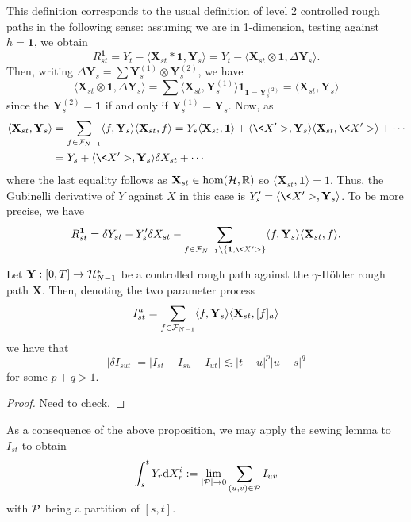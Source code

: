 \documentclass[11pt]{style/preprint}
\begin{document}
This definition corresponds to the usual definition of level 2 controlled rough paths in the following sense: 
assuming we are in 1-dimension, testing against \(h = \mathbf{1}\), we obtain
\[R^{\mathbf{1}}_{st} = Y_t - \langle \mathbf{X}_{st} * \mathbf{1}, \mathbf{Y}_s\rangle
  = Y_t - \langle \mathbf{X}_{st} \otimes \mathbf{1}, \Delta \mathbf{Y}_s\rangle.\]
Then, writing \(\Delta \mathbf{Y}_s = \sum \mathbf{Y}^{(1)}_s \otimes \mathbf{Y}^{(2)}_s\), we have 
\[\langle \mathbf{X}_{st} \otimes \mathbf{1}, \Delta \mathbf{Y}_s\rangle
  = \sum \langle \mathbf{X}_{st}, \mathbf{Y}^{(1)}_s\rangle \mathbf{1}_{\mathbf{1} = \mathbf{Y}^{(2)}_s} 
  = \langle \mathbf{X}_{st}, \mathbf{Y}_s\rangle\]
since the \(\mathbf{Y}^{(2)}_s = \mathbf{1}\) if and only if \(\mathbf{Y}^{(1)}_s = \mathbf{Y}_s\). 
Now, as 
\begin{align*}
  \langle \mathbf{X}_{st}, \mathbf{Y}_s\rangle 
  & = \sum_{f \in \CF_{N - 1}} \langle f, \mathbf{Y}_s\rangle \langle \mathbf{X}_{st}, f\rangle
    = Y_s \langle \mathbf{X}_{st}, \mathbf{1}\rangle 
      + \langle \<X'>, \mathbf{Y}_s\rangle \langle \mathbf{X}_{st}, \<X'>\rangle + \cdots\\
  & = Y_s + \langle \<X'>, \mathbf{Y}_s\rangle \delta X_{st} + \cdots
\end{align*}
where the last equality follows as \(\mathbf{X}_{st} \in \hom({\mathcal H}, \mathbb{R})\) so 
\(\langle \mathbf{X}_{st}, \mathbf{1}\rangle = 1\). Thus, the Gubinelli derivative of \(Y\) against 
\(X\) in this case is \(Y'_s = \langle \<X'>, \mathbf{Y}_s\rangle\). To be more precise, we have 
\[R^{\mathbf{1}}_{st} = \delta Y_{st} - Y'_s \delta X_{st} - 
  \sum_{f \in \CF_{N - 1} \setminus \{\mathbf{1}, \<X'>\}} \langle f, \mathbf{Y}_s\rangle \langle \mathbf{X}_{st}, f\rangle.\]
\begin{proposition}
  Let \(\mathbf{Y} : [0, T] \to {\mathcal H}^*_{N - 1}\) be a controlled rough path against the \(\gamma\)-H\"older 
  rough path \(\mathbf{X}\). Then, denoting the two parameter process
  \[I_{st}^a = \sum_{f \in {\mathcal F}_{N - 1}} \langle f, \mathbf{Y}_s\rangle \langle \mathbf{X}_{st}, [f]_a\rangle\] 
  we have that 
  \[|\delta I_{sut}| = |I_{st} - I_{su} - I_{ut}| \lesssim |t - u|^p|u - s|^q\]
  for some \(p + q > 1\).
\end{proposition}
\begin{proof}
  Need to check.
\end{proof}

As a consequence of the above proposition, we may apply the sewing lemma to \(I_{st}\) to obtain 
\[\int_s^t Y_r \dd X_r^i := \lim_{|{\mathcal P}| \to 0} \sum_{(u, v) \in {\mathcal P}} I_{uv}\]
with \({\mathcal P}\) being a partition of \([s, t]\).
\end{document}
